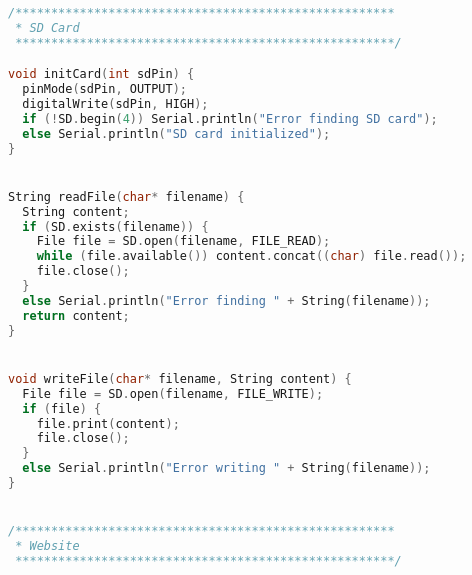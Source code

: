 \begin{lstlisting}[language=C,caption={Arduino},captionpos=b,basicstyle=\small,frame=single,breaklines=true]
/*****************************************************
 * SD Card
 *****************************************************/

void initCard(int sdPin) {
  pinMode(sdPin, OUTPUT);
  digitalWrite(sdPin, HIGH);
  if (!SD.begin(4)) Serial.println("Error finding SD card");
  else Serial.println("SD card initialized");
}


String readFile(char* filename) {
  String content;
  if (SD.exists(filename)) {
    File file = SD.open(filename, FILE_READ);
    while (file.available()) content.concat((char) file.read());
    file.close();
  }
  else Serial.println("Error finding " + String(filename));
  return content;
}


void writeFile(char* filename, String content) {
  File file = SD.open(filename, FILE_WRITE);
  if (file) {
    file.print(content);
    file.close();
  }
  else Serial.println("Error writing " + String(filename));
}


/*****************************************************
 * Website
 *****************************************************/


\end{lstlisting}
